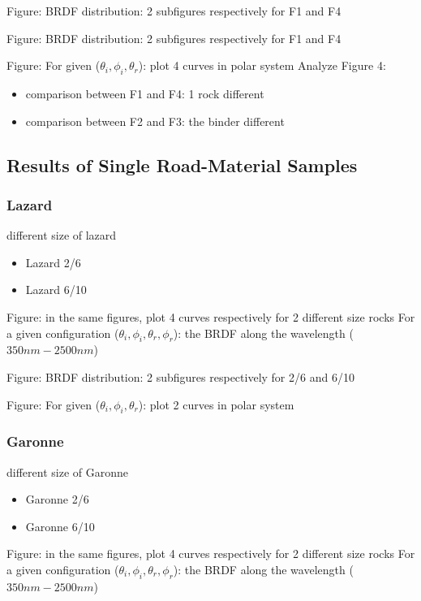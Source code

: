 Figure:
BRDF distribution: 2 subfigures respectively for F1 and F4


Figure:
BRDF distribution: 2 subfigures respectively for F1 and F4


Figure:
For given ($\theta_i, \phi_i, \theta_r$): plot 4 curves in polar system
Analyze Figure 4:
\begin{itemize}
    \item comparison between F1 and F4: 1 rock different
    \item comparison between F2 and F3: the binder different
\end{itemize}


\subsection{Results of Single Road-Material Samples}

\subsubsection{Lazard}

different size of lazard
\begin{itemize}
    \item Lazard 2/6
    \item Lazard 6/10
\end{itemize}

Figure: in the same figures, plot 4 curves respectively for 2 different size rocks
For a given configuration ($\theta_i, \phi_i, \theta_r, \phi_r$): the BRDF along the wavelength ($350nm - 2500nm$)

Figure:
BRDF distribution: 2 subfigures respectively for 2/6 and 6/10

Figure:
For given ($\theta_i, \phi_i, \theta_r$): plot 2 curves in polar system


\subsubsection{Garonne}
different size of Garonne
\begin{itemize}
    \item Garonne 2/6
    \item Garonne 6/10
\end{itemize}

Figure: in the same figures, plot 4 curves respectively for 2 different size rocks
For a given configuration ($\theta_i, \phi_i, \theta_r, \phi_r$): the BRDF along the wavelength ($350nm - 2500nm$)

